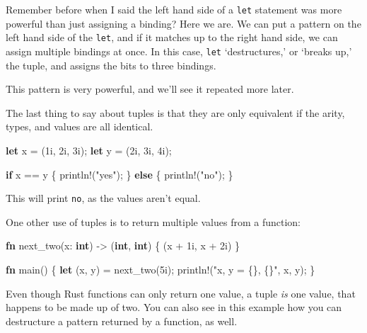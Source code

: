 \documentclass[]{article}
\newenvironment{Shaded}{}{}
\newcommand{\KeywordTok}[1]{\textcolor[rgb]{0.00,0.44,0.13}{\textbf{{#1}}}}
\newcommand{\DecValTok}[1]{\textcolor[rgb]{0.25,0.63,0.44}{{#1}}}
\newcommand{\StringTok}[1]{\textcolor[rgb]{0.25,0.44,0.63}{{#1}}}
\newcommand{\OtherTok}[1]{\textcolor[rgb]{0.00,0.44,0.13}{{#1}}}
\newcommand{\NormalTok}[1]{{#1}}
\begin{document}
Remember before when I said the left hand side of a \texttt{let}
statement was more powerful than just assigning a binding? Here we are.
We can put a pattern on the left hand side of the \texttt{let}, and if
it matches up to the right hand side, we can assign multiple bindings at
once. In this case, \texttt{let} `destructures,' or `breaks up,' the
tuple, and assigns the bits to three bindings.

This pattern is very powerful, and we'll see it repeated more later.

The last thing to say about tuples is that they are only equivalent if
the arity, types, and values are all identical.

\begin{Shaded}
\begin{Highlighting}[]
\KeywordTok{let} \NormalTok{x = (}\DecValTok{1i}\NormalTok{, }\DecValTok{2i}\NormalTok{, }\DecValTok{3i}\NormalTok{);}
\KeywordTok{let} \NormalTok{y = (}\DecValTok{2i}\NormalTok{, }\DecValTok{3i}\NormalTok{, }\DecValTok{4i}\NormalTok{);}

\KeywordTok{if} \NormalTok{x == y \{}
    \OtherTok{println!}\NormalTok{(}\StringTok{"yes"}\NormalTok{);}
\NormalTok{\} }\KeywordTok{else} \NormalTok{\{}
    \OtherTok{println!}\NormalTok{(}\StringTok{"no"}\NormalTok{);}
\NormalTok{\}}
\end{Highlighting}
\end{Shaded}

This will print \texttt{no}, as the values aren't equal.

One other use of tuples is to return multiple values from a function:

\begin{Shaded}
\begin{Highlighting}[]
\KeywordTok{fn} \NormalTok{next_two(x: }\KeywordTok{int}\NormalTok{) -> (}\KeywordTok{int}\NormalTok{, }\KeywordTok{int}\NormalTok{) \{ (x + }\DecValTok{1i}\NormalTok{, x + }\DecValTok{2i}\NormalTok{) \}}

\KeywordTok{fn} \NormalTok{main() \{}
    \KeywordTok{let} \NormalTok{(x, y) = next_two(}\DecValTok{5i}\NormalTok{);}
    \OtherTok{println!}\NormalTok{(}\StringTok{"x, y = \{\}, \{\}"}\NormalTok{, x, y);}
\NormalTok{\}}
\end{Highlighting}
\end{Shaded}

Even though Rust functions can only return one value, a tuple \emph{is}
one value, that happens to be made up of two. You can also see in this
example how you can destructure a pattern returned by a function, as
well.
\end{document}
